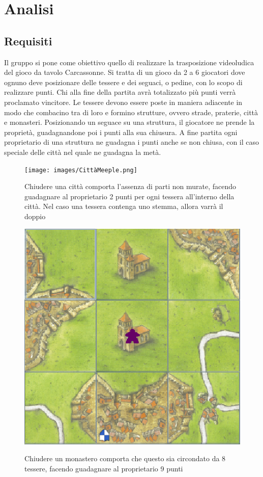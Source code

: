 \section{Analisi}
\subsection{Requisiti}

Il gruppo si pone come obiettivo quello di realizzare la trasposizione videoludica del gioco da tavolo Carcassonne. Si tratta di un gioco da 2 a 6 giocatori dove ognuno deve posizionare delle tessere e dei seguaci, o pedine, con lo scopo di realizzare punti. Chi alla fine della partita avrà totalizzato più punti verrà proclamato vincitore. Le tessere devono essere poste in maniera adiacente in modo che combacino tra di loro e formino strutture, ovvero strade, praterie, città e monasteri. Posizionando un seguace su una struttura, il giocatore ne prende la proprietà, guadagnandone poi i punti alla sua chiusura. A fine partita ogni proprietario di una struttura ne guadagna i punti anche se non chiusa, con il caso speciale delle città nel quale ne guadagna la metà.

\begin{figure}[hb]
    {\texttt{[image: images/CittàMeeple.png]}}

    \caption{Chiudere una città comporta l’assenza di parti non murate, facendo guadagnare al proprietario 2 punti per ogni tessera all'interno della città. Nel caso una tessera contenga uno stemma, allora varrà il doppio}
\end{figure}

\begin{figure}[hb]
    {\includegraphics[]{images/MonasteroMeeple.png}}

    \caption{Chiudere un monastero comporta che questo sia circondato da 8 tessere, facendo guadagnare al proprietario 9 punti}
\end{figure}

